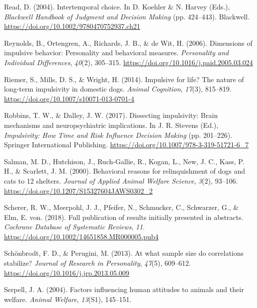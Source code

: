 \documentclass[
  ,pub,floatsintext]{apa6}
\newlength{\cslhangindent}
\newlength{\cslentryspacingunit} %
\newenvironment{CSLReferences}[2] %
 {%
  \setlength{\parindent}{0pt}
  \ifodd #1
  \let\oldpar\par
  \def\par{\hangindent=\cslhangindent\oldpar}
  \fi
  \setlength{\parskip}{#2\cslentryspacingunit}
 }%
 {}
\begin{document}
\begin{CSLReferences}{1}{0}
\leavevmode{}%
Read, D. (2004). Intertemporal choice. In D. Koehler \& N. Harvey (Eds.), \emph{Blackwell {Handbook} of {Judgment} and {Decision Making}} (pp. 424--443). {Blackwell}. \url{https://doi.org/10.1002/9780470752937.ch21}

\leavevmode{}%
Reynolds, B., Ortengren, A., Richards, J. B., \& de Wit, H. (2006). Dimensions of impulsive behavior: Personality and behavioral measures. \emph{Personality and Individual Differences}, \emph{40}(2), 305--315. \url{https://doi.org/10.1016/j.paid.2005.03.024}

\leavevmode{}%
Riemer, S., Mills, D. S., \& Wright, H. (2014). Impulsive for life? {The} nature of long-term impulsivity in domestic dogs. \emph{Animal Cognition}, \emph{17}(3), 815--819. \url{https://doi.org/10.1007/s10071-013-0701-4}

\leavevmode{}%
Robbins, T. W., \& Dalley, J. W. (2017). Dissecting impulsivity: Brain mechanisms and neuropsychiatric implications. In J. R. Stevens (Ed.), \emph{Impulsivity: {How Time} and {Risk Influence Decision Making}} (pp. 201--226). {Springer International Publishing}. \url{https://doi.org/10.1007/978-3-319-51721-6_7}

\leavevmode{}%
Salman, M. D., Hutchison, J., Ruch-Gallie, R., Kogan, L., New, J. C., Kass, P. H., \& Scarlett, J. M. (2000). Behavioral reasons for relinquishment of dogs and cats to 12 shelters. \emph{Journal of Applied Animal Welfare Science}, \emph{3}(2), 93--106. \url{https://doi.org/10.1207/S15327604JAWS0302_2}

\leavevmode{}%
Scherer, R. W., Meerpohl, J. J., Pfeifer, N., Schmucker, C., Schwarzer, G., \& Elm, E. von. (2018). Full publication of results initially presented in abstracts. \emph{Cochrane Database of Systematic Reviews}, \emph{11}. \url{https://doi.org/10.1002/14651858.MR000005.pub4}

\leavevmode{}%
Schönbrodt, F. D., \& Perugini, M. (2013). At what sample size do correlations stabilize? \emph{Journal of Research in Personality}, \emph{47}(5), 609--612. \url{https://doi.org/10.1016/j.jrp.2013.05.009}

\leavevmode{}%
Serpell, J. A. (2004). Factors influencing human attitudes to animals and their welfare. \emph{Animal Welfare}, \emph{13}(S1), 145--151.


\end{CSLReferences}
\end{document}
